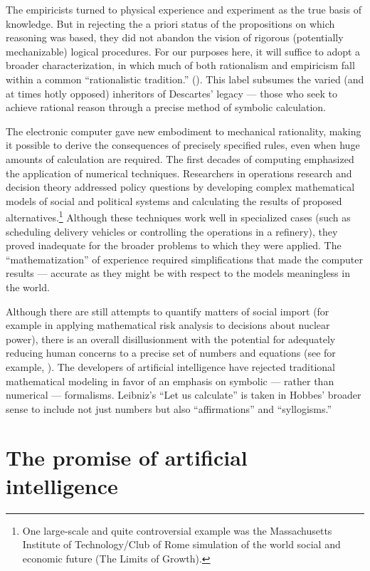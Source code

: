 \documentclass[12pt]{article}
\begin{document}
The empiricists turned to physical experience and experiment as the true basis of knowledge. But in rejecting the a priori status of the propositions on which reasoning was based, they did not abandon the vision of rigorous (potentially mechanizable) logical procedures. For our purposes here, it will suffice to adopt a broader characterization, in which much of both rationalism and empiricism fall within a common ``rationalistic tradition.'' (\cite{winograd-flores-1986}). This label subsumes the varied (and at times hotly opposed) inheritors of Descartes' legacy --- those who seek to achieve rational reason through a precise method of symbolic calculation.

The electronic computer gave new embodiment to mechanical rationality, making it possible to derive the consequences of precisely specified rules, even when huge amounts of calculation are required. The first decades of computing emphasized the application of numerical techniques. Researchers in operations research and decision theory addressed policy questions by developing complex mathematical models of social and political systems and calculating the results of proposed alternatives.\footnote{One large-scale and quite controversial example was the Massachusetts Institute of Technology/Club of Rome simulation of the world social and economic future
(The Limits of Growth).}
Although these techniques work well in specialized cases (such as scheduling delivery vehicles or controlling the operations in a refinery), they proved inadequate for the broader problems to which they were applied. The ``mathematization'' of experience required simplifications that made the computer results --- accurate as they might be with respect to the models meaningless in the world.

Although there are still attempts to quantify matters of social import (for example in applying mathematical risk analysis to decisions about nuclear power), there is an overall disillusionment with the potential for adequately reducing human concerns to a precise set of numbers and equations (see for example, \cite{davis1986}). The developers of artificial intelligence have rejected traditional mathematical modeling in favor of an emphasis on symbolic --- rather than numerical --- formalisms. Leibniz's ``Let us calculate'' is taken in Hobbes' broader sense to include not just numbers but also ``affirmations'' and ``syllogisms.''

\section{The promise of artificial intelligence}
\end{document}
